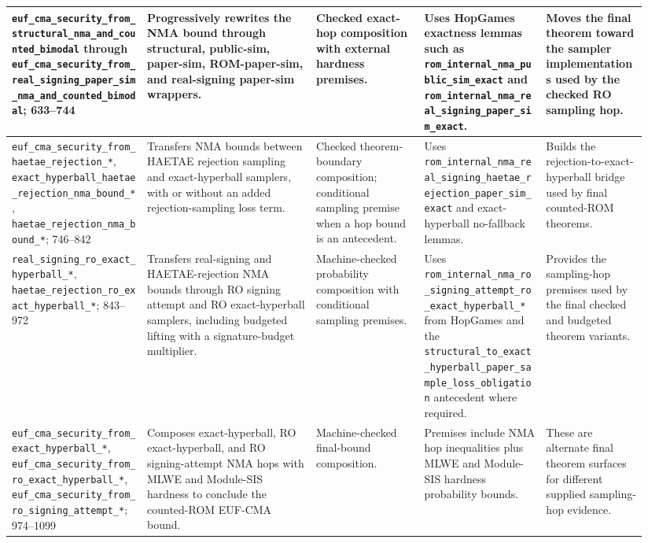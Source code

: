 \documentclass[11pt]{report}
\DeclareRobustCommand{\ec}[1]{\ifmmode\text{\nolinkurl{#1}}\else\nolinkurl{#1}\fi}
\theoremstyle{definition}
\theoremstyle{plain}
\begin{document}
{\begin{longtable}{p{0.20\linewidth}p{0.25\linewidth}p{0.16\linewidth}p{0.18\linewidth}p{0.15\linewidth}}
\midrule
\ec{euf\_cma\_security\_from\_structural\_nma\_and\_counted\_bimodal}
through
\ec{euf\_cma\_security\_from\_real\_signing\_paper\_sim\_nma\_and\_counted\_bimodal};
633--744 &
Progressively rewrites the NMA bound through structural, public-sim,
paper-sim, ROM-paper-sim, and real-signing paper-sim wrappers. &
Checked exact-hop composition with external hardness premises. &
Uses HopGames exactness lemmas such as
\ec{rom\_internal\_nma\_public\_sim\_exact} and
\ec{rom\_internal\_nma\_real\_signing\_paper\_sim\_exact}. &
Moves the final theorem toward the sampler implementations used by the checked
RO sampling hop. \\
\midrule
\ec{euf\_cma\_security\_from\_haetae\_rejection\_*},
\ec{exact\_hyperball\_haetae\_rejection\_nma\_bound\_*},
\ec{haetae\_rejection\_nma\_bound\_*}; 746--842 &
Transfers NMA bounds between HAETAE rejection sampling and exact-hyperball
samplers, with or without an added rejection-sampling loss term. &
Checked theorem-boundary composition; conditional sampling premise when a hop
bound is an antecedent. &
Uses \ec{rom\_internal\_nma\_real\_signing\_haetae\_rejection\_paper\_sim\_exact}
and exact-hyperball no-fallback lemmas. &
Builds the rejection-to-exact-hyperball bridge used by final counted-ROM
theorems. \\
\midrule
\ec{real\_signing\_ro\_exact\_hyperball\_*},
\ec{haetae\_rejection\_ro\_exact\_hyperball\_*}; 843--972 &
Transfers real-signing and HAETAE-rejection NMA bounds through RO signing
attempt and RO exact-hyperball samplers, including budgeted lifting with a
signature-budget multiplier. &
Machine-checked probability composition with conditional sampling premises. &
Uses \ec{rom\_internal\_nma\_ro\_signing\_attempt\_ro\_exact\_hyperball\_*}
from HopGames and the
\ec{structural\_to\_exact\_hyperball\_paper\_sample\_loss\_obligation}
antecedent where required. &
Provides the sampling-hop premises used by the final checked and budgeted
theorem variants. \\
\midrule
\ec{euf\_cma\_security\_from\_exact\_hyperball\_*},
\ec{euf\_cma\_security\_from\_ro\_exact\_hyperball\_*},
\ec{euf\_cma\_security\_from\_ro\_signing\_attempt\_*}; 974--1099 &
Composes exact-hyperball, RO exact-hyperball, and RO signing-attempt NMA hops
with MLWE and Module-SIS hardness to conclude the counted-ROM EUF-CMA bound. &
Machine-checked final-bound composition. &
Premises include NMA hop inequalities plus MLWE and Module-SIS hardness
probability bounds. &
These are alternate final theorem surfaces for different supplied sampling-hop
evidence. \\

\end{longtable}}
\end{document}
